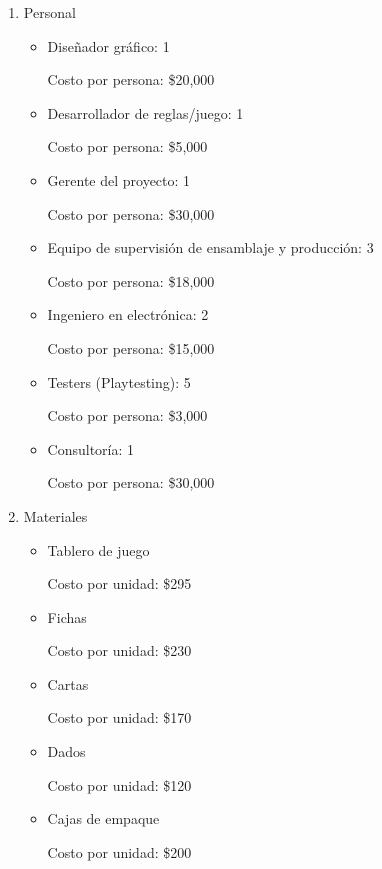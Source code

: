 \documentclass[12pt]{article}
\begin{document}
\begin{enumerate}
	\item Personal

	\begin{itemize}
		\item Diseñador gráfico: 1 

		Costo por persona: \$20,000

		\item Desarrollador de reglas/juego: 1

		Costo por persona: \$5,000

		\item Gerente del proyecto: 1

		Costo por persona: \$30,000

		\item Equipo de supervisión de ensamblaje y producción:  3

		Costo por persona: \$18,000

		\item Ingeniero en electrónica: 2

		Costo por persona: \$15,000

		\item Testers (Playtesting): 5

		Costo por persona: \$3,000

		\item Consultoría: 1

		Costo por persona: \$30,000

	\end{itemize}

	\item Materiales 

	\begin{itemize}
		\item Tablero de juego

		Costo por unidad: \$295

		\item Fichas

		Costo por unidad: \$230

		\item Cartas

		Costo por unidad: \$170

		\item Dados

		Costo por unidad: \$120

		\item Cajas de empaque

		Costo por unidad: \$200
	\end{itemize}


\end{enumerate}
\end{document}
